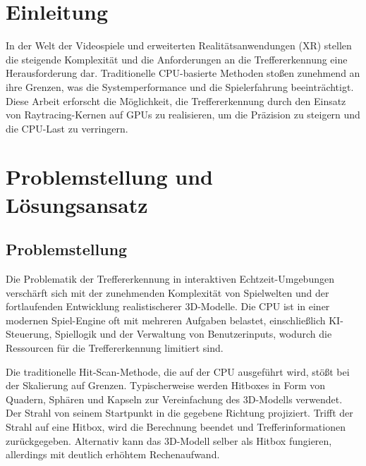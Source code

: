\documentclass[11pt]{scrartcl}
\begin{document}
	\section{Einleitung}

	In der Welt der Videospiele und erweiterten Realitätsanwendungen (XR) stellen die steigende Komplexität und die Anforderungen an die Treffererkennung eine Herausforderung dar. Traditionelle CPU-basierte Methoden stoßen zunehmend an ihre Grenzen, was die Systemperformance und die Spielerfahrung beeinträchtigt. Diese Arbeit erforscht die Möglichkeit, die Treffererkennung durch den Einsatz von Raytracing-Kernen auf GPUs zu realisieren, um die Präzision zu steigern und die CPU-Last zu verringern.
	
	\pagebreak
	
	\section{\label{sec:problem_loesung}Problemstellung und Lösungsansatz}

	\subsection{Problemstellung}
	
	Die Problematik der Treffererkennung in interaktiven Echtzeit-Umgebungen verschärft sich mit der zunehmenden Komplexität von Spielwelten und der fortlaufenden Entwicklung realistischerer 3D-Modelle. Die CPU ist in einer modernen Spiel-Engine oft mit mehreren Aufgaben belastet, einschließlich KI-Steuerung, Spiellogik und der Verwaltung von Benutzerinputs, wodurch die Ressourcen für die Treffererkennung limitiert sind. 
	
	Die traditionelle Hit-Scan-Methode, die auf der CPU ausgeführt wird, stößt bei der Skalierung auf Grenzen. Typischerweise werden Hitboxes in Form von Quadern, Sphären und Kapseln zur Vereinfachung des 3D-Modells verwendet. Der Strahl von seinem Startpunkt in die gegebene Richtung projiziert. Trifft der Strahl auf eine Hitbox, wird die Berechnung beendet und Trefferinformationen zurückgegeben. Alternativ kann das 3D-Modell selber als Hitbox fungieren, allerdings mit deutlich erhöhtem Rechenaufwand. 
	
\end{document}
